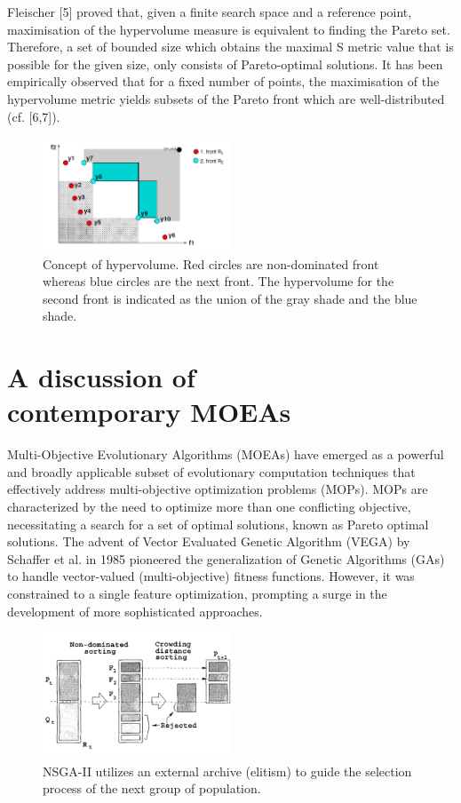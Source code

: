 \documentclass[%
 reprint,
 amsmath,amssymb,
 aps,
]{revtex4-2}
\begin{document}
Fleischer [5] proved that, given a finite search space and a reference point, maximisation of the hypervolume
measure is equivalent to finding the Pareto set. Therefore, a set of bounded size which obtains the
maximal S metric value that is possible for the given size, only consists of Pareto-optimal solutions. It has
been empirically observed that for a fixed number of points, the maximisation of the hypervolume metric
yields subsets of the Pareto front which are well-distributed (cf. [6,7]). \cite{SMS-EMOA}

\begin{figure}
\includegraphics[width=0.5\textwidth]{fig_2}
\caption{\label{fig:hypervolume} Concept of hypervolume. Red circles are non-dominated front whereas blue circles are the next front. The hypervolume for the second front is indicated as the union of the gray shade and the blue shade.}
\end{figure}



\section{\label{sec:level1}	
A discussion of \protect\\
contemporary MOEAs}

Multi-Objective Evolutionary Algorithms (MOEAs) have emerged as a powerful and broadly applicable subset of evolutionary computation techniques that effectively address multi-objective optimization problems (MOPs). MOPs are characterized by the need to optimize more than one conflicting objective, necessitating a search for a set of optimal solutions, known as Pareto optimal solutions. The advent of Vector Evaluated Genetic Algorithm (VEGA) by Schaffer et al. in 1985 pioneered the generalization of Genetic Algorithms (GAs) to handle vector-valued (multi-objective) fitness functions. However, it was constrained to a single feature optimization, prompting a surge in the development of more sophisticated approaches.

\begin{figure}[b]
\includegraphics[width=0.5\textwidth]{fig_1}
\caption{\label{fig:NSGA-II} NSGA-II utilizes an external archive (elitism) to guide the selection process of the next group of population.}
\end{figure}
\end{document}
